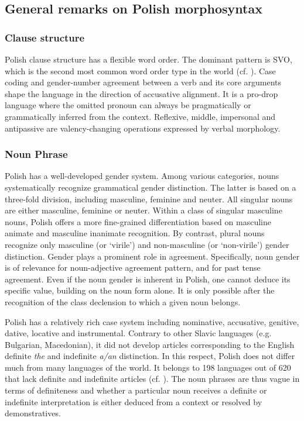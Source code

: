 \documentclass[output=paper]{langscibook}
\begin{document}
\subsection{General remarks on Polish morphosyntax} \label{sec:Janic:1.2}

\subsubsection{Clause structure} \label{sec:Janic:1.2.1}

Polish clause structure has a flexible word order. The dominant pattern is SVO, which is the second most common word order type in the world (cf. \citealt{Dryer2013}). Case coding and gender-number agreement between a verb and its core arguments shape the language in the direction of accusative alignment. It is a pro-drop language where the omitted pronoun can always be pragmatically or grammatically inferred from the context. Reflexive, middle, impersonal and antipassive are valency-changing operations expressed by verbal morphology.


\subsubsection{Noun Phrase} \label{sec:Janic:1.2.2}

Polish has a well-developed gender system. Among various categories, nouns systematically recognize grammatical gender distinction. The latter is based on a three-fold division, including masculine, feminine and neuter. All singular nouns are either masculine, feminine or neuter. Within a class of singular masculine nouns, Polish offers a more fine-grained differentiation based on masculine animate and masculine inanimate recognition. By contrast, plural nouns recognize only masculine (or ‘virile’) and non-masculine (or ‘non-virile’) gender distinction. Gender plays a prominent role in agreement. Specifically, noun gender is of relevance for noun-adjective agreement pattern, and for past tense agreement. Even if the noun gender is inherent in Polish, one cannot deduce its specific value, building on the noun form alone. It is only possible after the recognition of the class declension to which a given noun belongs. 

Polish has a relatively rich case system including nominative, accusative, genitive, dative, locative and instrumental. Contrary to other Slavic languages (e.g. Bulgarian, Macedonian), it did not develop articles corresponding to the English definite \textit{the} and indefinite \textit{a/an} distinction. In this respect, Polish does not differ much from many languages of the world. It belongs to 198 languages out of 620 that lack definite and indefinite articles (cf. \citealt{Dryer2005}). The noun phrases are thus vague in terms of definiteness and whether a particular noun receives a definite or indefinite interpretation is either deduced from a context or resolved by demonstratives. 
\end{document}
